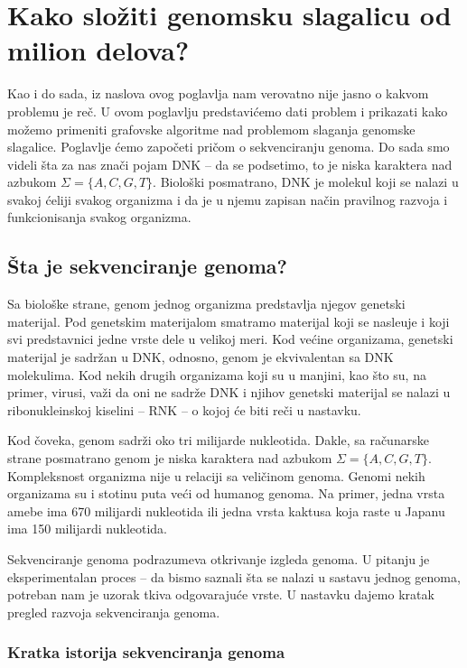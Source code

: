 \chapter{Kako složiti genomsku slagalicu od milion delova?}
\setbookcodestyle

Kao i do sada, iz naslova ovog poglavlja nam verovatno nije jasno o kakvom problemu je re\v c. U ovom poglavlju predstavi\'cemo dati problem i prikazati kako mo\v zemo primeniti grafovske algoritme nad problemom slaganja genomske slagalice. Poglavlje \'cemo zapo\v ceti pri\v com o sekvenciranju genoma. Do sada smo videli \v sta za nas zna\v ci pojam DNK -- da se podsetimo, to je niska karaktera nad azbukom $\Sigma = \{A, C, G, T\}$. Biolo\v ski posmatrano, DNK je molekul koji se nalazi u svakoj \'celiji svakog organizma i da je u njemu zapisan na\v cin pravilnog razvoja i funkcionisanja svakog organizma. 

\section{Šta je sekvenciranje genoma?}

Sa biološke strane, genom jednog organizma predstavlja njegov genetski materijal. Pod genetskim materijalom smatramo materijal koji se nasle\dj uje i koji svi predstavnici jedne vrste dele u velikoj meri. Kod većine organizama, genetski materijal je sadržan u DNK, odnosno, genom je ekvivalentan sa DNK molekulima. Kod nekih drugih organizama koji su u manjini, kao \v sto su, na primer, virusi, va\v zi da oni ne sadr\v ze DNK i njihov genetski materijal se nalazi u ribonukleinskoj kiselini -- RNK -- o kojoj \'ce biti re\v ci u nastavku. 

Kod čoveka, genom sadrži oko tri milijarde nukleotida. Dakle, sa računarske strane posmatrano genom je niska karaktera nad azbukom $\Sigma = \{A, C, G, T\}$. Kompleksnost organizma nije u relaciji sa veli\v cinom genoma. Genomi nekih organizama su i stotinu puta veći od humanog genoma. Na primer, jedna vrsta amebe ima 670 milijardi nukleotida ili jedna vrsta kaktusa koja raste u Japanu ima 150 milijardi nukleotida.

Sekvenciranje genoma podrazumeva otkrivanje izgleda genoma. U pitanju je eksperimentalan proces -- da bismo saznali \v sta se nalazi u sastavu jednog genoma, potreban nam je uzorak tkiva odgovaraju\'ce vrste. U nastavku dajemo kratak pregled razvoja sekvenciranja genoma.

\subsection{Kratka istorija sekvenciranja genoma}

